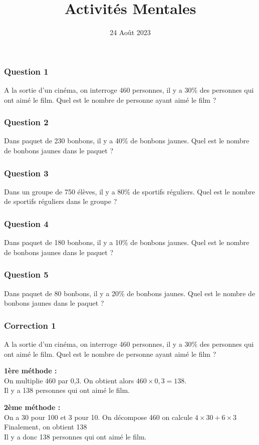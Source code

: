 \documentclass[15pt, mathserif]{beamer}
\title{Activités Mentales}
\date{24 Août 2023}
\begin{document}
\begin{frame}
    \titlepage
\end{frame}

\begin{frame} 
	\frametitle{Question 1}
A la sortie d'un cinéma, on interroge 460 personnes, il y a 30\% des personnes qui ont aimé le film. Quel est le nombre de personne ayant aimé le film ?\end{frame}


\begin{frame} 
	\frametitle{Question 2}
Dans paquet de 230 bonbons, il y a 40\% de bonbons jaunes. Quel est le nombre de bonbons jaunes dans le paquet ?\end{frame}


\begin{frame} 
	\frametitle{Question 3}
Dans un groupe de 750 élèves, il y a 80\% de sportifs réguliers. Quel est le nombre de sportifs réguliers dans le groupe ?\end{frame}


\begin{frame} 
	\frametitle{Question 4}
Dans paquet de 180 bonbons, il y a 10\% de bonbons jaunes. Quel est le nombre de bonbons jaunes dans le paquet ?\end{frame}


\begin{frame} 
	\frametitle{Question 5}
Dans paquet de 80 bonbons, il y a 20\% de bonbons jaunes. Quel est le nombre de bonbons jaunes dans le paquet ?\end{frame}


\begin{frame}
\vspace{-10mm}
	\frametitle{Correction 1}
A la sortie d'un cinéma, on interroge 460 personnes, il y a 30\% des personnes qui ont aimé le film. Quel est le nombre de personne ayant aimé le film ? \begin{multicols}{2} \textbf{1ère méthode : \\} On multiplie 460 par 0,3. On obtient alors $460 \times 0,3=138$. \\ Il y a 138 personnes qui ont aimé le film. 
 \columnbreak 
 
 \textbf{2ème méthode :} \\ On a 30 pour 100 et 3 pour 10. On décompose 460 on calcule $4\times30+6\times3$ \\ Finalement, on obtient 138\\ Il y a donc 138 personnes qui ont aimé le film. \end{multicols}\end{frame}
\end{document}
